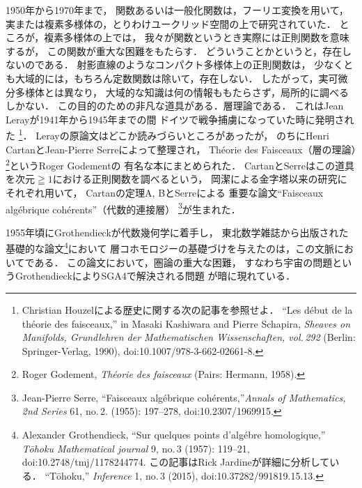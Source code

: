 \documentclass[11pt, a4paper, dvipdfmx]{jlreq}
\theoremstyle{definition}
\theoremstyle{mystyle}
\numberwithin{equation}{section} %
\begin{document}
1950年から1970年まで，
関数あるいは一般化関数は，フーリエ変換を用いて，
実または複素多様体の，とりわけユークリッド空間の上で研究されていた．
ところが，複素多様体の上では，
我々が関数というとき実際には正則関数を意味するが，
この関数が重大な困難をもたらす．
どういうことかというと，存在しないのである．
射影直線のようなコンパクト多様体上の正則関数は，
少なくとも大域的には，もちろん定数関数は除いて，存在しない．
したがって，実可微分多様体とは異なり，
大域的な知識は何の情報ももたらさず，局所的に調べるしかない．
この目的のための非凡な道具がある．層理論である．
これはJean Lerayが1941年から1945年までの間
ドイツで戦争捕虜になっていた時に発明された
\footnote[3]{
    Christian Houzelによる歴史に関する次の記事を参照せよ．
    ``Les d\'ebut de la th\'eorie des faisceaux,'' in Masaki Kashiwara and Pierre Schapira, \textit{Sheaves on Manifolds, Grundlehren der Mathematischen Wissenschaften, vol.\,292} (Berlin: Springer-Verlag, 1990), doi:10.1007/978-3-662-02661-8.
}．
Lerayの原論文はどこか読みづらいところがあったが，
のちにHenri CartanとJean-Pierre Serreによって整理され，
Th\'eorie des Faisceaux（層の理論）\footnote[4]{
    Roger Godement, \textit{Th\'eorie des faisceaux} (Pairs: Hermann, 1958).
}というRoger Godementの
有名な本にまとめられた．
CartanとSerreはこの道具を次元$\geqq1$における正則関数を調べるという，
岡潔による金字塔以来の研究にそれぞれ用いて，
Cartanの定理A, BとSerreによる
重要な論文``Faisceaux alg\'ebrique coh\'erents''（代数的連接層）
\footnote[5]{
    Jean-Pierre Serre, ``Faisceaux alg\'ebrique coh\'erents,''\textit{Annals of Mathematics, 2nd Series} 61, no.\,2. (1955): 197--278, doi:10.2307/1969915.
}が生まれた．

1955年頃にGrothendieckが代数幾何学に着手し，
東北数学雑誌から出版された基礎的な論文\footnote[6]{
    Alexander Grothendieck, 
    ``Sur quelques points d'alg\'ebre homologique,'' 
    \textit{T\=ohoku Mathematical journal} 9, no.\,3 (1957): 
    119--21, doi:10.2748/tmj/1178244774. 
    この記事はRick Jardineが詳細に分析している．
    ``T\=ohoku,'' \textit{Inference} 1, no.\,3 (2015), 
    doi:10.37282/991819.15.13.
}において
層コホモロジーの基礎づけを与えたのは，この文脈においてである．
この論文において，圏論の重大な困難，
すなわち宇宙の問題というGrothendieckによりSGA4で解決される問題
が暗に現れている．
\end{document}
